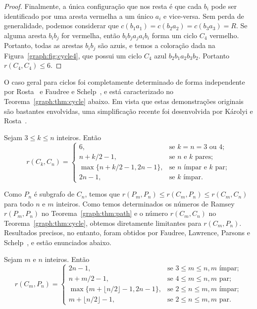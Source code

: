 \begin{proof}
Finalmente, a única configuração que nos resta é que cada $b_i$ pode ser identificado por uma aresta vermelha a um único $a_i$ e vice-versa. Sem perda de generalidade, podemos considerar que $c(b_1 a_1) = c(b_2 a_2) = c(b_3 a_3) = R$. Se alguma aresta $b_i b_j$ for vermelha, então $b_i b_j a_j a_i b_i$ forma um ciclo $C_4$ vermelho. Portanto, todas as arestas $b_i b_j$ são azuis, e temos a coloração dada na Figura~\ref{graph:fig:cycle4}, que possui um ciclo $C_4$ azul $b_2 b_1 a_2 b_3 b_2$. Portanto $r(C_4,C_4) \leq 6$.
\end{proof}

O caso geral para ciclos foi completamente determinado de forma independente por Rosta~\cite{rosta1973ramsey} e Faudree e Schelp~\cite{faudree1974all}, e está caracterizado no Teorema~\ref{graph:thm:cycle} abaixo. Em vista que estas demonstrações originais são bastantes envolvidas, uma simplificação recente foi desenvolvida por Károlyi e Rosta~\cite{karolyi2001generalized}.

\begin{theorem}
\label{graph:thm:cycle}
Sejam $3 \leq k \leq n$ inteiros. Então
\[r(C_k, C_n) = \begin{cases}
  6, & \text{se }k = n = 3 \text{ ou } 4;\\
  n + k/2 - 1, & \text{se }  n \text{ e } k \text{ pares}; \\
  \max\{n + k/2 - 1, 2n - 1\}, & \text{se } n \text{ ímpar e } k \text{ par};\\
  2n - 1 , & \text{se }  k \text{ ímpar}.
\end{cases}\]
\end{theorem}

Como $P_n$ é subgrafo de $C_n$, temos que $r(P_m, P_n) \leq r(C_m, P_n) \leq r(C_m, C_n)$ para todo $n$ e $m$ inteiros. Como temos determinados os números de Ramsey $r(P_m, P_n)$ no Teorema~\ref{graph:thm:path} e o número $r(C_m, C_n)$ no Teorema~\ref{graph:thm:cycle}, obtemos diretamente limitantes para $r(C_m, P_n)$. Resultados precisos, no entanto, foram obtidos por Faudree, Lawrence, Parsons e Schelp~\cite{faudree1974path}, e estão enunciados abaixo.


\begin{theorem}
\label{graph:thm:pathcycle}
Sejam $m$ e $n$ inteiros. Então
\[r(C_m, P_n) = \begin{cases}
  2n - 1, & \text{se }3 \leq m \leq n, m \text{ ímpar};\\
  n + m/2 - 1, & \text{se }4 \leq m \leq n, m \text{ par}; \\
  \max\{m + \lfloor n/2 \rfloor - 1, 2n - 1\}, & \text{se } 2 \leq n \leq m, m \text{ ímpar};\\
  m + \lfloor n/2 \rfloor -1 , & \text{se } 2 \leq n \leq m, m \text{ par}.
\end{cases}\]
\end{theorem}

